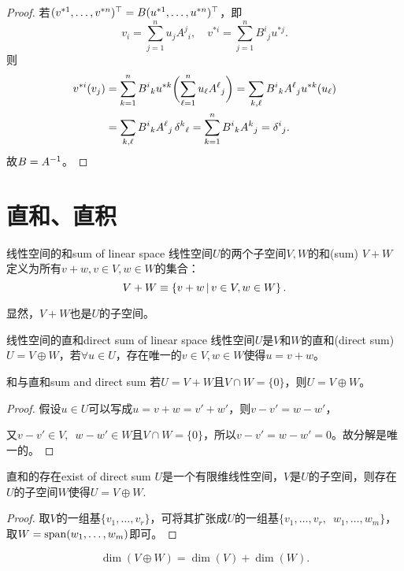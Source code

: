 \begin{proof}
	若$(v^{\ast 1},\ldots,v^{\ast n})^\top=B(u^{\ast 1},\ldots,u^{\ast n})^\top$，即
	\[
		v_i=\sum_{j=1}^nu_jA^j{}_i,\quad v^{\ast i}=\sum_{j=1}^nB^i{}_ju^{\ast j}.
	\]
	则
	\begin{align*}
		v^{\ast i}(v_j)&=\sum_{k=1}^nB^i{}_ku^{\ast k}\biggl(\sum_{\ell=1}^n u_\ell A^\ell{}_j\biggr)=\sum_{k,\ell}B^i{}_kA^\ell{}_ju^{\ast k}(u_\ell)\\
		&=\sum_{k,\ell}B^i{}_kA^\ell{}_j\mathop{}\!\delta^k{}_\ell=\sum_{k=1}^nB^i{}_kA^k{}_j=\delta^i{}_j.
	\end{align*}
	故$B=A^{-1}$。
\end{proof}
\section{直和、直积}
\begin{definition}{线性空间的和}{sum of linear space}
	线性空间$U$的两个子空间$V,W$的和(sum) $V+W$定义为所有$v+w,v\in V,w\in W$的集合：
	\begin{equation}
		V+W\equiv\left\{v+w\,\middle\vert\,v\in V,w\in W\right\}.
	\end{equation}
\end{definition}
显然，$V+W$也是$U$的子空间。
\begin{definition}{线性空间的直和}{direct sum of linear space}
	线性空间$U$是$V$和$W$的直和(direct sum) $U=V\oplus W$，若$\forall u\in U$，存在唯一的$v\in V,w\in W$使得$u=v+w$。
\end{definition}
\begin{theorem}{和与直和}{sum and direct sum}
	若$U=V+W$且$V\cap W=\{0\}$，则$U=V\oplus W$。
\end{theorem}
\begin{proof}
	假设$u\in U$可以写成$u=v+w=v'+w'$，则$v-v'=w-w'$，
	
	又$v-v'\in V,\enspace w-w'\in W$且$V\cap W=\{0\}$，所以$v-v'=w-w'=0$。故分解是唯一的。
\end{proof}
\begin{theorem}{直和的存在}{exist of direct sum}
	$U$是一个有限维线性空间，$V$是$U$的子空间，则存在$U$的子空间$W$使得$U=V\oplus W.$
\end{theorem}
\begin{proof}
	取$V$的一组基$\{v_1,\ldots,v_r\}$，可将其扩张成$U$的一组基$\{v_1,\ldots,v_r,$\ $w_1,\ldots,w_m\}$，取$W=\operatorname{span}(w_1,\ldots,w_m)$即可。
\end{proof}
\begin{corollary}
	\begin{equation}
		\dim(V\oplus W)=\dim(V)+\dim(W).
	\end{equation}
\end{corollary}
